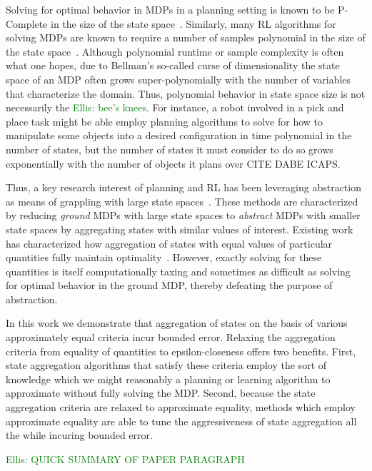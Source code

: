 \documentclass{article}
\newcommand\enote[1]{\textcolor{green}{Ellis: #1}}
\begin{document}
Solving for optimal behavior in \acp{MDP} in a planning setting is known to be P-Complete in the size of the state space~\cite{littman1995complexity,papadimitriou1987complexity}. Similarly, many \ac{RL} algorithms for solving MDPs are known to require a number of samples polynomial in the size of the state space~\cite{strehl2009reinforcement}. Although polynomial runtime or sample complexity is often what one hopes, due to Bellman's so-called curse of dimensionality the state space of an MDP often grows super-polynomially with the number of variables that characterize the domain. Thus, polynomial behavior in state space size is not necessarily the \enote{bee's knees}. For instance, a robot involved in a pick and place task might be able employ planning algorithms to solve for how to manipulate some objects into a desired configuration in time polynomial in the number of states, but the number of states it must consider to do so grows exponentially with the number of objects it plans over CITE DABE ICAPS.

Thus, a key research interest of planning and RL has been leveraging abstraction as means of grappling with large state spaces~\cite{andre2002state,jong2005state,dietterich2000hierarchical,Bean2011}. These methods are characterized by reducing \textit{ground} MDPs with large state spaces to \textit{abstract} MDPs with smaller state spaces by aggregating states with similar values of interest. Existing work has characterized how aggregation of states with equal values of particular quantities fully maintain optimality~\cite{li2006towards,dean1997modelmin}. However, exactly solving for these quantities is itself computationally taxing and sometimes as difficult as solving for optimal behavior in the ground MDP, thereby defeating the purpose of abstraction.

In this work we demonstrate that aggregation of states on the basis of various approximately equal criteria incur bounded error.  Relaxing the aggregation criteria from equality of quantities to epsilon-closeness offers two benefits. First, state aggregation algorithms that satisfy these criteria employ the sort of knowledge which we might reasonably a planning or learning algorithm to approximate without fully solving the MDP. Second, because the state aggregation criteria are relaxed to approximate equality, methods which employ approximate equality are able to tune the aggressiveness of state aggregation all the while incuring bounded error.
	
\enote{QUICK SUMMARY OF PAPER PARAGRAPH}
\end{document}
